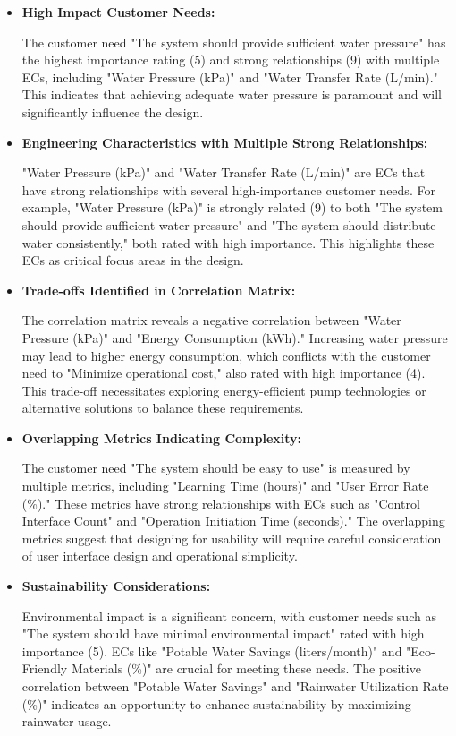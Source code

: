 \documentclass[12pt]{report}
\begin{document}
\begin{itemize}
    \item \textbf{High Impact Customer Needs:}

    The customer need "The system should provide sufficient water pressure" has the highest importance rating (5) and strong relationships (9) with multiple ECs, including "Water Pressure (kPa)" and "Water Transfer Rate (L/min)." This indicates that achieving adequate water pressure is paramount and will significantly influence the design.

    \item \textbf{Engineering Characteristics with Multiple Strong Relationships:}

    "Water Pressure (kPa)" and "Water Transfer Rate (L/min)" are ECs that have strong relationships with several high-importance customer needs. For example, "Water Pressure (kPa)" is strongly related (9) to both "The system should provide sufficient water pressure" and "The system should distribute water consistently," both rated with high importance. This highlights these ECs as critical focus areas in the design.

    \item \textbf{Trade-offs Identified in Correlation Matrix:}

    The correlation matrix reveals a negative correlation between "Water Pressure (kPa)" and "Energy Consumption (kWh)." Increasing water pressure may lead to higher energy consumption, which conflicts with the customer need to "Minimize operational cost," also rated with high importance (4). This trade-off necessitates exploring energy-efficient pump technologies or alternative solutions to balance these requirements.

    \item \textbf{Overlapping Metrics Indicating Complexity:}

    The customer need "The system should be easy to use" is measured by multiple metrics, including "Learning Time (hours)" and "User Error Rate (\%)." These metrics have strong relationships with ECs such as "Control Interface Count" and "Operation Initiation Time (seconds)." The overlapping metrics suggest that designing for usability will require careful consideration of user interface design and operational simplicity.

    \item \textbf{Sustainability Considerations:}

    Environmental impact is a significant concern, with customer needs such as "The system should have minimal environmental impact" rated with high importance (5). ECs like "Potable Water Savings (liters/month)" and "Eco-Friendly Materials (\%)" are crucial for meeting these needs. The positive correlation between "Potable Water Savings" and "Rainwater Utilization Rate (\%)" indicates an opportunity to enhance sustainability by maximizing rainwater usage.


\end{itemize}
\end{document}
